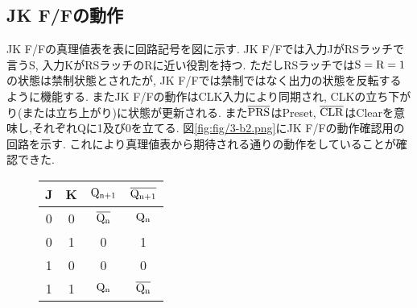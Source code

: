 \subsection{JK F/Fの動作}
JK F/Fの真理値表を表に回路記号を図に示す.
JK F/Fでは入力JがRSラッチで言うS,
入力KがRSラッチのRに近い役割を持つ.
ただしRSラッチでは$\rm S=R=1$の状態は禁制状態とされたが,
JK F/Fでは禁制ではなく出力の状態を反転するように機能する.
またJK F/Fの動作はCLK入力により同期され,
CLKの立ち下がり(または立ち上がり)に状態が更新される.
また$\rm\overline{PRS}$はPreset,
$\rm\overline{CLR}$はClearを意味し,それぞれQに1及び0を立てる.
図\ref{fig:fig/3-b2.png}にJK F/Fの動作確認用の回路を示す.
これにより真理値表から期待される通りの動作をしていることが確認できた.
\begin{figure}[h]
  \def\@captype{table}
  \begin{minipage}[t]{.48\textwidth}
    \begin{center}
      \begin{tabular}{cccc}
        \hline
        J & K & $\rm Q_{n+1}$ & $\rm\overline{Q_{n+1}}$\\
        \hline
        0 & 0 & $\rm \overline{Q_n}$ & $\rm Q_n$\\
        0 & 1 & 0 & 1\\
        1 & 0 & 0 & 0\\
        1 & 1 & $\rm Q_n$ & $\rm \overline{Q_n}$\\
        \hline
      \end{tabular}
    \end{center}
    \label{tab:JKFF}
  \end{minipage}
  \hfill
  \begin{minipage}[c]{.48\textwidth}
  \end{minipage}
\end{figure}
